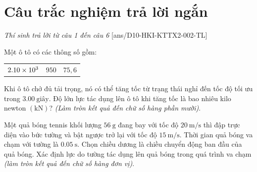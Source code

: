 \section{Câu trắc nghiệm trả lời ngắn} \textit{Thí sinh trả lời từ câu 1 đến câu 6}
\setcounter{ex}{0}
[ans/D10-HKI-KTTX2-002-TL]
\begin{ex}
	Một ô tô có các thông số gồm:
	\begin{center}
		\begin{tabular}{|M{5cm}|M{5cm}|M{5cm}|}
			\hline
			 &&\\
			\hline
			$\SI{2.10E3}{}$ & $950$ & $75,6$\\
			\hline
		\end{tabular}
	\end{center}
	Khi ô tô chở đủ tải trọng, nó có thể tăng tốc từ trạng thái nghỉ đến tốc độ tối ưu trong $\SI{3.00}{\text{giây}}$. Độ lớn lực tác dụng lên ô tô khi tăng tốc là bao nhiêu kilo newton $\left(\si{\kilo\newton}\right)$? \textit{(Làm tròn kết quả đến chữ số hàng phần mười)}.
	\loigiai{
		
	}
\end{ex}
\begin{ex}
	Một quả bóng tennis khối lượng $\SI{56}{\gram}$ đang bay với tốc độ $\SI{20}{\meter/\second}$ thì đập trực diện vào bức tường và bật ngược trở lại với tốc độ $\SI{15}{\meter/\second}$. Thời gian quả bóng va chạm với tường là $\SI{0.05}{\second}$. Chọn chiều dương là chiều chuyển động ban đầu của quả bóng. Xác định lực do tường tác dụng lên quả bóng trong quá trình va chạm \textit{(làm tròn kết quả đến chữ số hàng đơn vị)}. 
	\loigiai{
		
	}
\end{ex}

